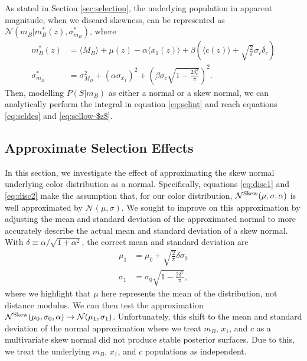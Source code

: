 \documentclass[a4paper,fleqn,usenatbib]{emulateapj}
\begin{document}
As stated in Section \ref{sec:selection}, the underlying population in apparent magnitude, when we discard skewness, can be represented as $\mathcal{N}(m_B|m_B^*(z), \sigma^*_{m_B})$, where
\begin{align}
m_B^*(z) &= \langle M_B \rangle + \mu(z) - \alpha \langle x_1(z) \rangle + \beta \left(\langle c(z) \rangle + \sqrt{\frac{2}{\pi}}\sigma_c \delta_c\right)\label{eq:disc1} \\
\sigma^*_{m_B} &= \sigma_{M_B}^2 + (\alpha \sigma_{x_1})^2 +  \left(\beta \sigma_c \sqrt{1 - \frac{2\delta_c^2}{\pi}}\right)^2. \label{eq:disc2}
\end{align}
Then, modelling $P(S|m_B)$ as either a normal or a skew normal, we can analytically perform the integral in equation \eqref{eq:selint} and reach equations \eqref{eq:seldes} and \eqref{eq:sellow-$z$}.





\subsection{Approximate Selection Effects}
\label{app:approx}

In this section, we investigate the effect of approximating the skew normal underlying color distribution as a normal. Specifically, equations \eqref{eq:disc1} and \eqref{eq:disc2} make the assumption that, for our color distribution, $\mathcal{N}^{\rm Skew}(\mu, \sigma, \alpha)$ is well approximated by $\mathcal{N}(\mu, \sigma)$. We sought to improve on this approximation by adjusting the mean and standard deviation of the approximated normal to more accurately describe the actual mean and standard deviation of a skew normal. With $\delta \equiv \alpha/\sqrt{1+\alpha^2}$, the correct mean and standard deviation are
\begin{align}
\mu_1 &= \mu_0 + \sqrt{\frac{2}{\pi}} \delta \sigma_0 \\
\sigma_1 &= \sigma_0 \sqrt{1 - \frac{2 \delta^2}{\pi}},
\end{align}
where we highlight that $\mu$ here represents the mean of the distribution, not distance modulus. We can then test the approximation $\mathcal{N}^{\rm Skew}(\mu_0, \sigma_0, \alpha) \rightarrow \mathcal{N}(\mu_1, \sigma_1)$. Unfortunately, this shift to the mean and standard deviation of the normal approximation where we treat $m_B$, $x_1$, and $c$ as a multivariate skew normal did not produce stable posterior surfaces. Due to this, we treat the underlying $m_B$, $x_1$, and $c$ populations as independent. 
\end{document}
